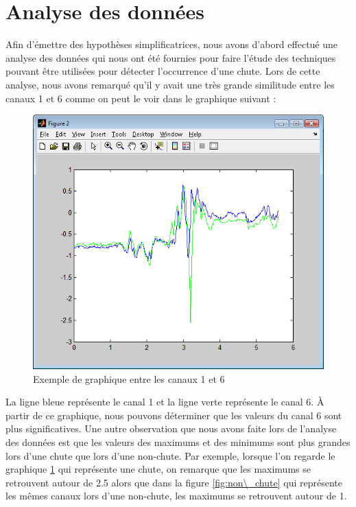 \documentclass[12pt,letterpaper]{article}
\begin{document}
\section{Analyse des données} %
Afin d'émettre des hypothèses simplificatrices, nous avons d'abord effectué une analyse des données qui nous ont été fournies pour faire l'étude des techniques pouvant être utilisées pour détecter l'occurrence d'une chute. Lors de cette analyse, nous avons remarqué qu'il y avait une très grande similitude entre les canaux 1 et 6 comme on peut le voir dans le graphique suivant :

\begin{figure}
\centering
\includegraphics[scale=0.5]{images/semblable.png}
\caption{Exemple de graphique entre les canaux 1 et 6}
\label{fig:semblable}
\end{figure}

La ligne bleue représente le canal 1 et la ligne verte représente le canal 6. À partir de ce graphique, nous pouvons déterminer que les valeurs du canal 6 sont plus significatives. Une autre observation que nous avons faite lors de l'analyse des données est que les valeurs des maximums et des minimums sont plus grandes lors d'une chute que lors d'une non-chute. Par exemple, lorsque l'on regarde le graphique \ref{fig:semblable} qui représente une chute, on remarque que les maximums se retrouvent autour de 2.5 alors que dans la figure \ref{fig:non\_chute} qui représente les mêmes canaux lors d'une non-chute, les maximums se retrouvent autour de 1.
\end{document}
